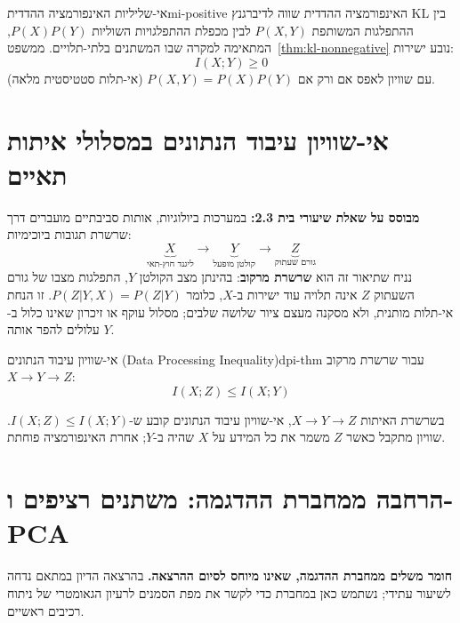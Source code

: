 \begin{corollary}{אי-שליליות האינפורמציה ההדדית}{mi-positive}
האינפורמציה ההדדית שווה לדיברגנץ KL בין ההתפלגות המשותפת $P(X,Y)$ לבין מכפלת ההתפלגויות השוליות $P(X)P(Y)$, המתאימה למקרה שבו המשתנים בלתי-תלויים.
ממשפט~\ref{thm:kl-nonnegative} נובע ישירות:
\begin{equation}
\boxed{I(X; Y) \ge 0}
\end{equation}
עם שוויון לאפס אם ורק אם $P(X,Y) = P(X)P(Y)$ (אי-תלות סטטיסטית מלאה).
\end{corollary}

\section{אי-שוויון עיבוד הנתונים במסלולי איתות תאיים}\label{sec:data-processing}
\textbf{מבוסס על שאלת שיעורי בית 2.3:}
במערכות ביולוגיות, אותות סביבתיים מועברים דרך שרשרת תגובות ביוכימיות:
\begin{equation}\label{eq:signalling-chain}
\underbrace{X}_{\text{ליגנד חוץ-תאי}} \longrightarrow \underbrace{Y}_{\text{קולטן מופעל}} \longrightarrow \underbrace{Z}_{\text{גורם שעתוק}}
\end{equation}
נניח שתיאור זה הוא \textbf{שרשרת מרקוב}: בהינתן מצב הקולטן $Y$, התפלגות מצבו של גורם השעתוק $Z$ אינה תלויה עוד ישירות ב-$X$, כלומר $P(Z|Y,X)=P(Z|Y)$. זו הנחת אי-תלות מותנית, ולא מסקנה מעצם ציור שלושה שלבים; מסלול עוקף או זיכרון שאינו כלול ב-$Y$ עלולים להפר אותה.

\begin{theorem}{אי-שוויון עיבוד הנתונים (\textenglish{Data Processing Inequality})}{dpi-thm}
עבור שרשרת מרקוב $X \to Y \to Z$:
\begin{equation}\label{eq:dpi}
\boxed{I(X; Z) \le I(X; Y)}
\end{equation}
\end{theorem}

\begin{remark}
בשרשרת האיתות $X\to Y\to Z$, אי-שוויון עיבוד הנתונים קובע ש-$I(X;Z)\le I(X;Y)$. שוויון מתקבל כאשר $Z$ משמר את כל המידע על $X$ שהיה ב-$Y$; אחרת האינפורמציה פוחתת.
\end{remark}

\section{הרחבה ממחברת ההדגמה: משתנים רציפים ו-PCA}\label{sec:pca-bridge}
\textbf{חומר משלים ממחברת ההדגמה, שאינו מיוחס לסיום ההרצאה.} בהרצאה הדיון במתאם נדחה לשיעור עתידי; נשתמש כאן במחברת כדי לקשר את מפת הסמנים לרעיון הגאומטרי של ניתוח רכיבים ראשיים.

